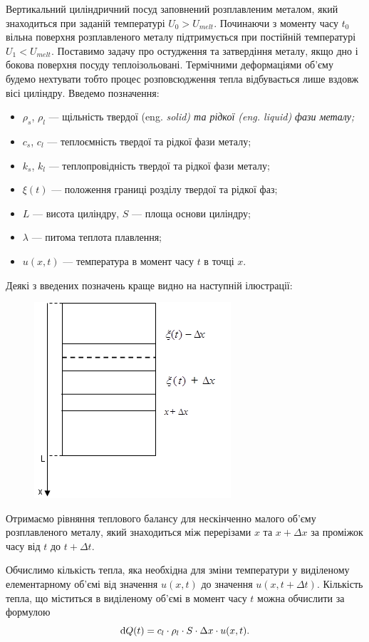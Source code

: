 Вертикальний циліндричний посуд заповнений розплавленим металом, який знаходиться при заданій температурі $U_0 > U_{melt}$. Починаючи з моменту часу $t_0$ вільна поверхня розплавленого металу підтримується при постійній температурі $U_1 < U_{melt}$. Поставимо задачу про остудження та затвердіння металу, якщо дно і бокова поверхня посуду теплоізольовані. Термічними деформаціями об'єму будемо нехтувати тобто процес розповсюдження тепла відбувається лише вздовж вісі циліндру. Введемо позначення: 
\begin{itemize}
 	\item $\rho_s$, $\rho_l$ --- щільність твердої (eng. \it{solid}) та рідкої (eng. \it{liquid}) фази металу;
	\item $c_s$, $c_l$ --- теплоємність твердої та рідкої фази металу;
	\item $k_s$, $k_l$ --- теплопровідність твердої та рідкої фази металу;
	\item $\xi(t)$ --- положення границі розділу твердої та рідкої фаз;
	\item $L$ --- висота циліндру, $S$ --- площа основи циліндру; 
	\item $\lambda$ --- питома теплота плавлення;
	\item $u(x, t)$ --- температура в момент часу $t$ в точці $x$.
\end{itemize}

Деякі з введених позначень краще видно на наступній ілюстрації:
\begin{figure}[H]
	\centering
	\includegraphics[width=.5\textwidth]{img/7-1.png}
\end{figure}

Отримаємо рівняння теплового балансу для нескінченно малого об'єму розплавленого металу, який знаходиться між перерізами $x$ та $x + \Delta x$ за проміжок часу від $t$ до $t + \Delta t$. \medskip

Обчислимо кількість тепла, яка необхідна для зміни температури у виділеному елементарному об'ємі від значення $u(x, t)$ до значення $u(x, t + \Delta t)$. Кількість тепла, що міститься в виділеному об'ємі в момент часу $t$ можна обчислити за формулою
\begin{equation}
	\mathop{}\!\mathrm{d} Q(t) = c_l \cdot \rho_l \cdot S \cdot \Delta x \cdot u(x, t).
\end{equation}

